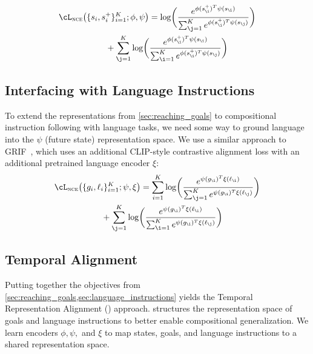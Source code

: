 \begin{rebuttal}
    \begin{align}
        &\cL_{\textsc{nce}}\bigl(\{s_{i},s_{i}^{+}\}_{i=1}^{K};\phi,\psi\bigr) =
        \log \biggl( {\frac{e^{\phi(s^+_{\i})^{T}\psi(s_{\i})}}{\sum_{{\j=1}}^{K}
                e^{\phi(s^+_{\i})^{T}\psi(s_{\j})}}} \biggr)  \nonumber\\*
                &\mspace{100mu} +
        \sum_{{\j=1}}^{K} \log \biggl( {\frac{e^{\phi(s^+_{\i})^{T}\psi(s_{\i})}}{\sum_{{\i=1}}^{K}
                e^{\phi(s^+_{\i})^{T}\psi(s_{\j})}}} \biggr)
        \label{eq:goal_alignment}
    \end{align}

        
\end{rebuttal}
\subsection{Interfacing with Language Instructions}
\label{sec:language_instructions}

To extend the representations from \cref{sec:reaching_goals} to compositional instruction following with language tasks, we need some way to ground language into the $\psi$ (future state)
representation space.
We use a similar approach to GRIF~\citep{myers2023goal}, which uses an additional CLIP-style \citep{radford2021learning} contrastive alignment loss with an additional pretrained language encoder $\xi$:
\begin{align}
    &\cL_{\textsc{nce}}\bigl(\{g_{i},\ell_{i}\}_{i=1}^{K};\psi,\xi\bigr)
    = \sum_{{i=1}}^{K} \log \biggl( {\frac{e^{\psi(g_{\i})^{T}\xi(\ell_{\i})}}{\sum_{{\j=1}}^{K}
            e^{\psi(g_{\i})^{T}\xi(\ell_{\j})}}} \biggr)  \nonumber\\*
            &\mspace{100mu} +
    \sum_{{\j=1}}^{K} \log \biggl( {\frac{e^{\psi(g_{\i})^{T}\xi(\ell_{\i})}}{\sum_{{\i=1}}^{K}
            e^{\psi(g_{\i})^{T}\xi(\ell_{\j})}}} \biggr)
    \label{eq:task_alignment}
\end{align}

\subsection{Temporal Alignment}
\label{sec:temporal_alignment}

Putting together the objectives from \cref{sec:reaching_goals,sec:language_instructions} yields the Temporal Representation Alignment (\Method) approach.
\Method{} structures the representation space of goals and language instructions to better enable compositional generalization.
We learn encoders $\phi, \psi ,$ and $\xi$ to map states, goals, and language instructions to a shared representation space.

